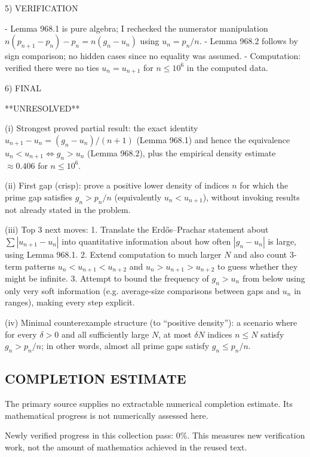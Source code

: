 5) VERIFICATION

- Lemma 968.1 is pure algebra; I rechecked the numerator manipulation $n(p_{n+1}-p_n)-p_n = n(g_n-u_n)$ using $u_n=p_n/n$.
- Lemma 968.2 follows by sign comparison; no hidden cases since no equality was assumed.
- Computation: verified there were no ties $u_n=u_{n+1}$ for $n\le 10^6$ in the computed data.

6) FINAL

**UNRESOLVED**

(i) Strongest proved partial result: the exact identity $u_{n+1}-u_n=(g_n-u_n)/(n+1)$ (Lemma 968.1) and hence the equivalence $u_n<u_{n+1}\iff g_n>u_n$ (Lemma 968.2), plus the empirical density estimate $\approx 0.406$ for $n\le 10^6$.

(ii) First gap (crisp): prove a positive lower density of indices $n$ for which the prime gap satisfies $g_n>p_n/n$ (equivalently $u_n<u_{n+1}$), without invoking results not already stated in the problem.

(iii) Top 3 next moves:
1. Translate the Erd\H{o}s--Prachar statement about $\sum |u_{n+1}-u_n|$ into quantitative information about how often $|g_n-u_n|$ is large, using Lemma 968.1.
2. Extend computation to much larger $N$ and also count 3-term patterns $u_n<u_{n+1}<u_{n+2}$ and $u_n>u_{n+1}>u_{n+2}$ to guess whether they might be infinite.
3. Attempt to bound the frequency of $g_n>u_n$ from below using only very soft information (e.g. average-size comparisons between gaps and $u_n$ in ranges), making every step explicit.

(iv) Minimal counterexample structure (to “positive density”): a scenario where for every $\delta>0$ and all sufficiently large $N$, at most $\delta N$ indices $n\le N$ satisfy $g_n>p_n/n$; in other words, almost all prime gaps satisfy $g_n\le p_n/n$.




\subsection*{COMPLETION ESTIMATE}
The primary source supplies no extractable numerical completion estimate. Its mathematical progress is not numerically assessed here.

Newly verified progress in this collection pass: $0\%$. This measures new verification work, not the amount of mathematics achieved in the reused text.

